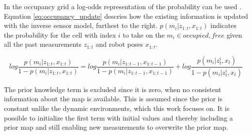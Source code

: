 In the occupancy grid a log-odds representation of the probability can be used \cite{probRob}. 
Equation \ref{eq:occupancy_update} descries how the existing information is updated with the inverse sensor model, furthest to the right. $p(m_i|z_{1:t},x_{1:t})$ indicates the probability for the cell with index $i$ to take on the $m_i \in {occupied,free}$ given all the past measurements $z_{1:t}$ and robot poses $x_{1:t}$. 

\begin{equation}
	log \frac{p(m_i|z_{1:t},x_{1:t})}{1-p(m_i|z_{1:t},x_{1:t})} = log \frac{p(m_i|z_{1:t-1},x_{1:t-1})}{1-p(m_i|z_{1:t-1},x_{1:t-1})} + log \frac{ p(m_i | z_t^i,x_t) }{ 1 - p(m_i | z_t^i,x_t) }
	\label{eq:occupancy_update}
\end{equation}

The prior knowledge term is excluded since it is zero, when no consistent information about the map is available. 
This is assumed since the prior is constant unlike the dynamic environments, which this work focuses on.
It is possible to initialize the first term with initial values and thereby including a prior map and still enabling new measurements to overwrite the prior map.